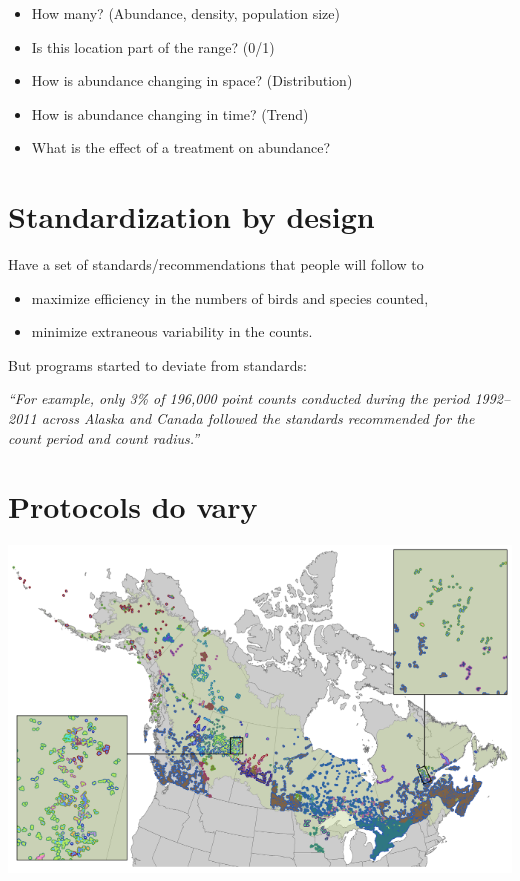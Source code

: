\documentclass[12pt,]{scrbook}
\providecommand{\tightlist}{%
  \setlength{\itemsep}{0pt}\setlength{\parskip}{0pt}}
\begin{document}
\begin{itemize}
\tightlist
\item
  How many? (Abundance, density, population size)
\item
  Is this location part of the range? (0/1)
\item
  How is abundance changing in space? (Distribution)
\item
  How is abundance changing in time? (Trend)
\item
  What is the effect of a treatment on abundance?
\end{itemize}

\hypertarget{standardization-by-design}{%
\section{Standardization by design}\label{standardization-by-design}}

Have a set of standards/recommendations that people will follow to

\begin{itemize}
\tightlist
\item
  maximize efficiency in the numbers of birds and species counted,
\item
  minimize extraneous variability in the counts.
\end{itemize}

But programs started to deviate from standards:

\emph{``For example, only 3\% of 196,000 point counts conducted during the period
1992--2011 across Alaska and Canada followed the standards recommended for the count period and count radius.''}

\hypertarget{protocols-do-vary}{%
\section{Protocols do vary}\label{protocols-do-vary}}

\includegraphics[width=9.43in]{./_images/barker-2015-fig-2}
\end{document}

